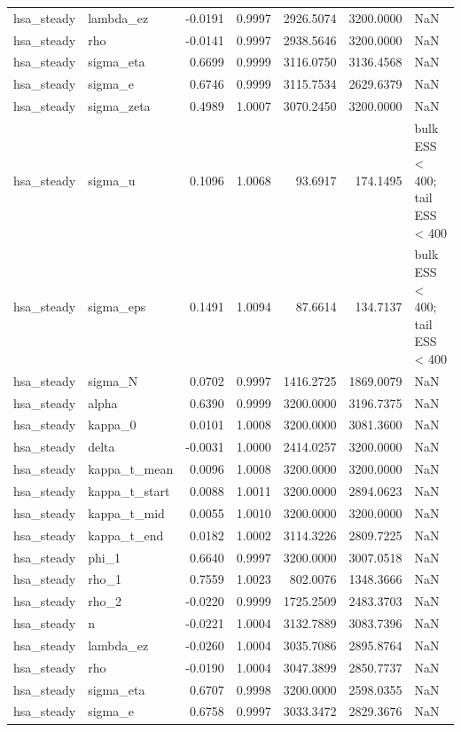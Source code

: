 \begin{tabular}{llrrrrl}
hsa\_steady & lambda\_ez & -0.0191 & 0.9997 & 2926.5074 & 3200.0000 & NaN \\
hsa\_steady & rho & -0.0141 & 0.9997 & 2938.5646 & 3200.0000 & NaN \\
hsa\_steady & sigma\_eta & 0.6699 & 0.9999 & 3116.0750 & 3136.4568 & NaN \\
hsa\_steady & sigma\_e & 0.6746 & 0.9999 & 3115.7534 & 2629.6379 & NaN \\
hsa\_steady & sigma\_zeta & 0.4989 & 1.0007 & 3070.2450 & 3200.0000 & NaN \\
hsa\_steady & sigma\_u & 0.1096 & 1.0068 & 93.6917 & 174.1495 & bulk ESS < 400; tail ESS < 400 \\
hsa\_steady & sigma\_eps & 0.1491 & 1.0094 & 87.6614 & 134.7137 & bulk ESS < 400; tail ESS < 400 \\
hsa\_steady & sigma\_N & 0.0702 & 0.9997 & 1416.2725 & 1869.0079 & NaN \\
hsa\_steady & alpha & 0.6390 & 0.9999 & 3200.0000 & 3196.7375 & NaN \\
hsa\_steady & kappa\_0 & 0.0101 & 1.0008 & 3200.0000 & 3081.3600 & NaN \\
hsa\_steady & delta & -0.0031 & 1.0000 & 2414.0257 & 3200.0000 & NaN \\
hsa\_steady & kappa\_t\_mean & 0.0096 & 1.0008 & 3200.0000 & 3200.0000 & NaN \\
hsa\_steady & kappa\_t\_start & 0.0088 & 1.0011 & 3200.0000 & 2894.0623 & NaN \\
hsa\_steady & kappa\_t\_mid & 0.0055 & 1.0010 & 3200.0000 & 3200.0000 & NaN \\
hsa\_steady & kappa\_t\_end & 0.0182 & 1.0002 & 3114.3226 & 2809.7225 & NaN \\
hsa\_steady & phi\_1 & 0.6640 & 0.9997 & 3200.0000 & 3007.0518 & NaN \\
hsa\_steady & rho\_1 & 0.7559 & 1.0023 & 802.0076 & 1348.3666 & NaN \\
hsa\_steady & rho\_2 & -0.0220 & 0.9999 & 1725.2509 & 2483.3703 & NaN \\
hsa\_steady & n & -0.0221 & 1.0004 & 3132.7889 & 3083.7396 & NaN \\
hsa\_steady & lambda\_ez & -0.0260 & 1.0004 & 3035.7086 & 2895.8764 & NaN \\
hsa\_steady & rho & -0.0190 & 1.0004 & 3047.3899 & 2850.7737 & NaN \\
hsa\_steady & sigma\_eta & 0.6707 & 0.9998 & 3200.0000 & 2598.0355 & NaN \\
hsa\_steady & sigma\_e & 0.6758 & 0.9997 & 3033.3472 & 2829.3676 & NaN \\

\end{tabular}
